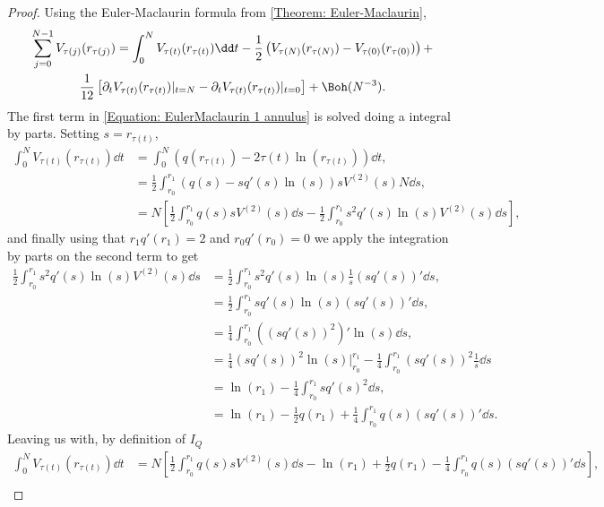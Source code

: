 \begin{proof}
	Using the Euler-Maclaurin formula from \autoref{Theorem: Euler-Maclaurin}, 
	\begin{multline}
		\sum_{j=0}^{N-1} V_{\tau(j)}(r_{\tau(j)}) = \int_0^N V_{\tau(t)}(r_{\tau(t)})  \dd t - \frac{1}{2} \left( V_{\tau(N)}(r_{\tau(N)})  - V_{\tau(0)}(r_{\tau(0)}) \right) + \\ \frac{1}{12} \left[ \partial_t V_{\tau(t)}(r_{\tau(t)}) |_{t=N} - \partial_t V_{\tau(t)}(r_{\tau(t)}) |_{t=0} \right] + \Boh(N^{-3}).
		\label{Equation: EulerMaclaurin 1 annulus}
	\end{multline}
	The first term in \eqref{Equation: EulerMaclaurin 1 annulus} is solved doing a integral by parts. Setting $s = r_{\tau(t)}$,
	\begin{align}
		\int_0^N V_{\tau(t)}(r_{\tau(t)})  \dd t & = \int_0^N (q(r_{\tau(t)}) - 2 \tau(t) \ln(r_{\tau(t)})) \dd t, \\
		& = \frac{1}{2} \int_{r_0}^{r_1} (q(s) - s q'(s) \ln(s)) s V^{(2)}(s) N \dd s, \\
		& = N \left[  \frac{1}{2} \int_{r_0}^{r_1} q(s) s V^{(2)}(s) \dd s -  \frac{1}{2} \int_{r_0}^{r_1} s^2 q'(s) \ln(s) V^{(2)}(s) \dd s \right],
	\end{align}
	and finally using that $r_1 q'(r_1) = 2$ and $r_0 q'(r_0) = 0$ we apply the integration by parts on the second term to get
	\begin{align}
		\frac{1}{2} \int_{r_0}^{r_1} s^2 q'(s) \ln(s) V^{(2)}(s) \dd s & = \frac{1}{2} \int_{r_0}^{r_1} s^2 q'(s) \ln(s) \frac{1}{s} (s q'(s))' \dd s, \\
		&= \frac{1}{2} \int_{r_0}^{r_1} s q'(s) \ln(s) (s q'(s))' \dd s, \\
		& = \frac{1}{4} \int_{r_0}^{r_1} ((sq'(s))^2)' \ln(s) \dd s, \\
		& = \frac{1}{4} (s q'(s))^2 \ln(s) \Big|_{r_0}^{r_1} - \frac{1}{4}  \int_{r_0}^{r_1} (s q'(s))^2 \frac{1}{s} \dd s \\
		& = \ln(r_1) - \frac{1}{4} \int_{r_0}^{r_1} s q'(s)^2 \dd s, \\
		& = \ln(r_1) - \frac{1}{2} q(r_1) + \frac{1}{4} \int_{r_0}^{r_1} q(s) (s q'(s))' \dd s.
	\end{align}
	Leaving us with, by definition of $I_Q$
	\begin{align}
		\int_0^N V_{\tau(t)}(r_{\tau(t)})  \dd t & = N \left[\frac{1}{2} \int_{r_0}^{r_1} q(s) s V^{(2)}(s) \dd s - \ln(r_1) + \frac{1}{2} q(r_1) - \frac{1}{4} \int_{r_0}^{r_1} q(s) (s q'(s))' \dd s \right],  \\

\end{align}
\end{proof}
